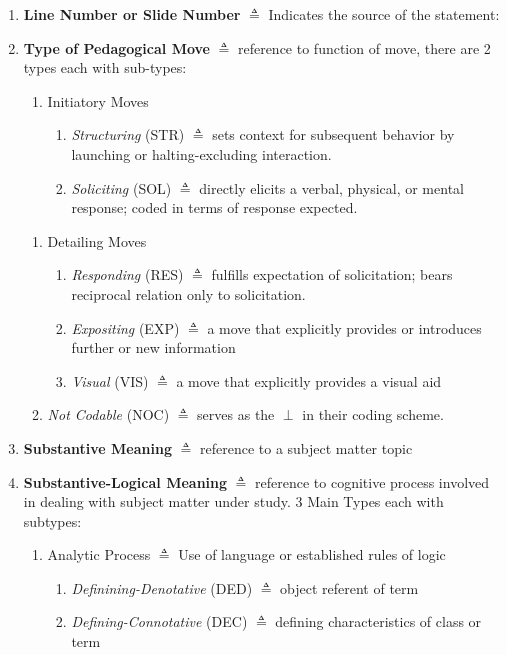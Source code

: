 \documentclass[10pt, letterpaper]{article}
\begin{document}
\begin{enumerate}
\item \textbf{Line Number or Slide Number} \(\triangleq\) Indicates the source of the statement:
\item \textbf{Type of Pedagogical Move} \(\triangleq\) reference to function of move, there are 2 types each with sub-types:
\begin{enumerate}
\item Initiatory Moves
\begin{enumerate}
\item \emph{Structuring} (STR) \(\triangleq\) sets context for subsequent behavior by launching or halting-excluding interaction.
\item \emph{Soliciting} (SOL) \(\triangleq\) directly elicits a verbal, physical, or mental response; coded in terms of response expected.
\end{enumerate}
\end{enumerate}
\begin{enumerate}
\item Detailing Moves
\begin{enumerate}
\item \emph{Responding} (RES) \(\triangleq\) fulfills expectation of solicitation; bears reciprocal relation only to solicitation.
\item \emph{Expositing} (EXP) \(\triangleq\) a move that explicitly provides or introduces further or new information
\item \emph{Visual} (VIS) \(\triangleq\) a move that explicitly provides a visual aid
\end{enumerate}
\item \emph{Not Codable} (NOC) \(\triangleq\) serves as the \(\perp\) in their coding scheme.
\end{enumerate}
\item \textbf{Substantive Meaning} \(\triangleq\) reference to a subject matter topic
\item \textbf{Substantive-Logical Meaning} \(\triangleq\) reference to cognitive process involved in dealing with subject matter under study. 3 Main Types each with subtypes:
\begin{enumerate}
\item Analytic Process \(\triangleq\) Use of language or established rules of logic
\begin{enumerate}
\item \emph{Definining-Denotative} (DED) \(\triangleq\) object referent of term
\item \emph{Defining-Connotative} (DEC) \(\triangleq\) defining characteristics of class or term

\end{enumerate}
\end{enumerate}
\end{enumerate}
\end{document}

